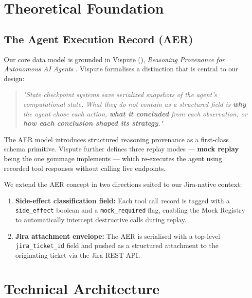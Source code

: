 \documentclass[11pt, a4paper]{article}
\begin{document}
\section{Theoretical Foundation}

\subsection{The Agent Execution Record (AER)}

Our core data model is grounded in Vispute (\rmfamily), \textit{Reasoning Provenance for Autonomous AI Agents} \cite{vispute2026}. Vispute formalises a distinction that is central to our design:

\begin{quote}
\dialogfont\large\itshape
"State checkpoint systems save serialized snapshots of the agent's computational state. What they do not contain as a structured field is \textbf{why} the agent chose each action, \textbf{what it concluded} from each observation, or \textbf{how each conclusion shaped its strategy}."
\end{quote}

The AER model introduces structured reasoning provenance as a first-class schema primitive. Vispute further defines three replay modes — \textbf{mock replay} being the one gommage implements — which re-executes the agent using recorded tool responses without calling live endpoints.

We extend the AER concept in two directions suited to our Jira-native context:
\begin{enumerate}[leftmargin=1.5em, itemsep=0.3em]
  \item \textbf{Side-effect classification field:} Each tool call record is tagged with a \texttt{side\_effect} boolean and a \texttt{mock\_required} flag, enabling the Mock Registry to automatically intercept destructive calls during replay.
  \item \textbf{Jira attachment envelope:} The AER is serialised with a top-level \texttt{jira\_ticket\_id} field and pushed as a structured attachment to the originating ticket via the Jira REST API.
\end{enumerate}

\section{Technical Architecture}
\end{document}
